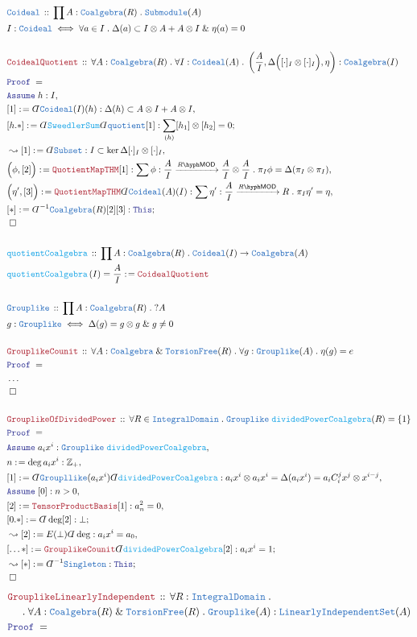 \documentclass[12pt]{scrartcl}%
\newcommand{\TYPE}[1]{\textcolor{NavyBlue}{\mathtt{#1}}}%
\newcommand{\FUNC}[1]{\textcolor{Cerulean}{\mathtt{#1}}}%
\newcommand{\LOGIC}[1]{\textcolor{Blue}{\mathtt{#1}}}%
\newcommand{\THM}[1]{\textcolor{Maroon}{\mathtt{#1}}}%
\renewcommand{\.}{\; . \;} %
\newcommand{\de}{: \kern 0.1pc =} %
\newcommand{\Act}[1]{\left( #1 \right)} %
\newcommand{\Theorem}[2]{& \THM{#1} \, :: \, #2 \\ & \Proof = \\ } %
\newcommand{\DeclareType}[2]{& \TYPE{#1} \, :: \, #2 \\}%
\newcommand{\DefineType}[3]{& #1 : \TYPE{#2} \iff #3 \\}%
\newcommand{\DeclareFunc}[2]{& \FUNC{#1} \, :: \, #2 \\}%
\newcommand{\DefineNamedFunc}[4]{&  \FUNC{#1}\Act{#2} = #3 \de #4 \\}%
\newcommand{\NewLine}{\\ & \kern 1pc}%
\newcommand{\Page}[1]{ \begin{align*} #1 \end{align*}  }%
\newcommand{ \bd }{ \ByDef }%
\newcommand{\NoProof}{ & \ldots \\ \EndProof}%
\renewcommand{\And}{\; \& \;}%
\newcommand{\Int}{\mathbb{Z}}%
\newcommand{\Say}[3]{& #1 \de #2 : #3, \\} %
\newcommand{\Conclude}[3]{& #1 \de #2 : #3; \\}%
\newcommand{\Derive}[3]{& \leadsto #1 \de #2 : #3, \\} %
\newcommand{\DeriveConclude}[3]{& \leadsto #1 \de #2 : #3 ; \\} %
\newcommand{\Assume}[2]{& \LOGIC{Assume} \; #1 : #2, \\} %
\newcommand{\QED}{\; \square} %
\newcommand{\EndProof}{& \QED \\} %
\newcommand{\ByDef}{\rotatebox[origin=c]{-180}{$D$}}%
\newcommand{\Proof}{\LOGIC{Proof} \; } %
\newcommand{\Arrow}[1]{\xrightarrow{#1}}%
\newcommand{\LIS}{\TYPE{LinearlyIndependentSet}}
\newcommand{\LMOD}[1]{#1\hyph\mathsf{MOD}} %
\newcommand{\ID}{\TYPE{IntegralDomain}}
\begin{document}
\Page{
	\DeclareType{Coideal}{ \prod A : \TYPE{Coalgebra}(R) \. \TYPE{Submodule}(A) }
	\DefineType{I}{Coideal}{ \forall a \in I \. \Delta(a) \subset I \otimes A +  A \otimes I \And \eta(a) = 0 }
	\\
	\Theorem{CoidealQuotient}{\forall A : \TYPE{Coalgebra}(R) \. \forall I : \TYPE{Coideal}(A) \.  \left( \frac{A}{I},  \Delta\Big([\cdot]_I\otimes [\cdot]_I\Big),\eta \right) : \TYPE{Coalgebra}(I)}
	\Assume{h}{I}
	\Say{[1]}{\bd \TYPE{Coideal}(I)(h)}{\Delta(h) \subset A \otimes I  + A \otimes I}
	\Conclude{[h.*]}{ \bd \FUNC{SweedlerSum}\bd \TYPE{quotient}[1]}{\sum_{(h)} [h_1] \otimes [h_2] = 0  }
	\Derive{[1]}{\bd \TYPE{Subset}}{I \subset \ker \Delta [\cdot]_I \otimes [\cdot]_I}
	\Say{\Big(\phi,[2]\Big)}{\THM{QuotientMapTHM}[1]}{\sum \phi : \frac{A}{I} \Arrow{\LMOD{R}} \frac{A}{I} \otimes \frac{A}{I} \. \pi_I \phi = \Delta (\pi_I \otimes \pi_I)  }
	\Say{\Big(\eta',[3]\Big)}{\THM{QuotientMapTHM}\bd\TYPE{Coideal}(A)(I)}{\sum \eta' : \frac{A}{I} \Arrow{\LMOD{R}} R \. \pi_I \eta' = \eta  }
	\Conclude{[*]}{\bd^{-1}\TYPE{Coalgebra}(R)[2][3]}{\LOGIC{This}}
	\EndProof
	\\
	\DeclareFunc{quotientCoalgebra}{\prod A : \TYPE{Coalgebra}(R) \. \TYPE{Coideal}(I) \to \TYPE{Coalgebra}(A)}
	\DefineNamedFunc{quotientCoalgebra}{I}{\frac{A}{I}}{\THM{CoidealQuotient}}
	\\
	\DeclareType{Grouplike}{ \prod A : \TYPE{Coalgebra}(R) \. ?A}
	\DefineType{g}{Grouplike}{\Delta(g) = g \otimes g \And g \neq 0}
	\\
	\Theorem{GrouplikeCounit}{\forall A : \TYPE{Coalgebra} \And \TYPE{TorsionFree}(R) \. \forall g : \TYPE{Grouplike}(A) \. \eta(g) = e}
	\NoProof
	\\
	\Theorem{GrouplikeOfDividedPower}{ \forall R \in \ID \. \TYPE{Grouplike}\;\FUNC{dividedPowerCoalgebra}(R) = \{1\}}
	\Assume{a_i x^i}{\TYPE{Grouplike}\;\FUNC{dividedPowerCoalgebra}}
	\Say{n}{\deg a_i x^i}{\Int_+}
	\Say{[1]}{\bd \TYPE{Groupllike}(a_i x^i)\bd \FUNC{dividedPowerCoalgebra}}
	{
		a_ix^i \otimes a_ix^i = \Delta(a_ix^i)  = a_i C^j_i x^j \otimes x^{i-j}            
	}
	\Assume{[0]}{n > 0}
	\Say{[2]}{\THM{TensorProductBasis}[1]}{a_n^2 = 0}
	\Conclude{[0.*]}{\bd \deg [2]}{ \bot  }
	\Derive{[2]}{E(\bot)\bd \deg}{ a_i x^i = a_0}
	\Conclude{[\ldots*]}{\THM{GrouplikeCounit}\bd \FUNC{dividedPowerCoalgebra}[2]}{ a_i x^i = 1  } 
	\DeriveConclude{[*]}{\bd^{-1} \TYPE{Singleton}}{\LOGIC{This}}
	\EndProof
}\Page{
	\Theorem{GrouplikeLinearlyIndependent}{\forall R : \ID \. \NewLine \. \forall A : \TYPE{Coalgebra}(R) \And \TYPE{TorsionFree}(R) \. \TYPE{Grouplike}(A) : \LIS(A)}
}
\end{document}
